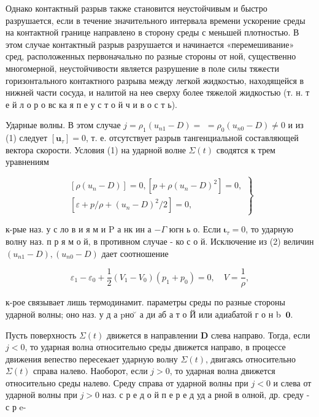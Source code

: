 \documentclass[10pt]{article}
\begin{document}
Однако контактный разрыв также становится неустойчивым и быстро разрушается, если в течение значительного интервала времени ускорение среды на контактной границе направлено в сторону среды с меньшей плотностью. В этом случае контактный разрыв разрушается и начинается «перемешивание» сред, расположенных первоначально по разные стороны от ной, существенно многомерной, неустойчивости является разрушение в поле силы тяжести горизонтального контактного разрыва между легкой жидкостью, находящейся в нижней части сосуда, и налитой на неө сверху более тяжелой жидкостью (т. н. т е й л о р о вс ка я п е у с т о й ч и в о с т ь).



Ударные волны. В этом случае $j=\rho_{1}\left(u_{n 1}-D\right)=$ $=\rho_{0}\left(u_{n 0}-D\right) \neq 0$ и из (1) следует $\left[\boldsymbol{u}_{\tau}\right]=0$, т. е. отсутствует разрыв тангенциальной составляющей вектора скорости. Условия (1) на ударной волне $\Sigma(t)$ сводятся к трем уравнениям



\[

\left.\begin{array}{l}

{\left[\rho\left(u_{n}-D\right)\right]=0,\left[p+\rho\left(u_{n}-D\right)^{2}\right]=0,} \\

{\left[\varepsilon+p / \rho+\left(u_{n}-D\right)^{2} / 2\right]=0,}

\end{array}\right\}

\]



к-рые наз. у с ло в и я м и $\mathrm{P}$ а нк ин а $-\Gamma$ югн ь о. Если $\boldsymbol{\iota}_{\tau}=0$, то ударную волну наз. п р я м о й, в противном случае - ко с о й. Исключение из (2) величин $\left(u_{n 1}-D\right),\left(u_{n 0}-D\right)$ дает соотношение



\[

\varepsilon_{1}-\varepsilon_{0}+\frac{1}{2}\left(V_{1}-V_{0}\right)\left(p_{1}+p_{0}\right)=0, \quad V=\frac{1}{\rho},

\]



к-рое связывает лишь термодинамит. параметры среды по разные стороны ударной волны; оно наз. у д а pно ̆ а ди аб а т о Й или адиабатой г о н b $\mathbf{~} \mathbf{0}$.



Пусть поверхность $\Sigma(t)$ движется в направлении $\boldsymbol{D}$ слева направо. Тогда, если $j<0$, то ударная волна относительно среды движется направо, в процессе движения вепество пересекает ударную волну $\Sigma(t)$, двигаясь относительно $\Sigma(t)$ справа налево. Наоборот, если $j>0$, то ударная волна движется относительно среды налево. Среду справа от ударной волны при $j<0$ и слева от ударной волны при $j>0$ наз. с р е д о й п е р е д уд а рной в олной, др. среду - с р e-
\end{document}

